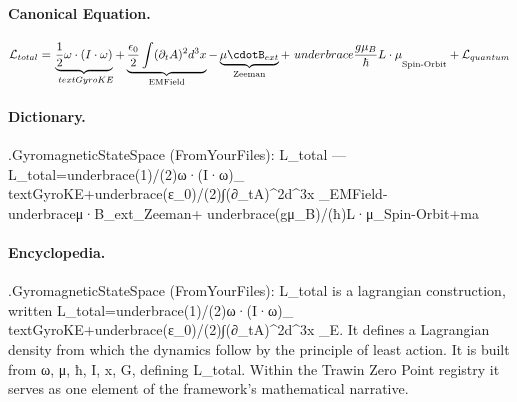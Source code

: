 \paragraph{Canonical Equation.}
\[
\mathcal{L}_{total}=\underbrace{\frac{1}{2}\omega\cdot(I\cdot\omega)}_{\ text{GyroKE}}+\underbrace{\frac{\epsilon_0}{2}\int(\partial_tA)^2d^3x }_{\text{EMField}}-\underbrace{\mu\cdotB_{ext}}_{\text{Zeeman}}+\ underbrace{\frac{g\mu_B}{\hbar}L\cdot\mu}_{\text{Spin-Orbit}}+\mathcal{ L}_{quantum}
\]

\paragraph{Dictionary.}
.GyromagneticStateSpace (FromYourFiles): L\_total — L\_total=underbrace(1)/(2)ω·(I·ω)\_ textGyroKE+underbrace(ε\_0)/(2)∫(∂\_tA)\textasciicircum{}2d\textasciicircum{}3x \_EMField-underbraceμ·B\_ext\_Zeeman+ underbrace(gμ\_B)/(ħ)L·μ\_Spin-Orbit+ma

\paragraph{Encyclopedia.}
.GyromagneticStateSpace (FromYourFiles): L\_total is a lagrangian construction, written L\_total=underbrace(1)/(2)ω·(I·ω)\_ textGyroKE+underbrace(ε\_0)/(2)∫(∂\_tA)\textasciicircum{}2d\textasciicircum{}3x \_E. It defines a Lagrangian density from which the dynamics follow by the principle of least action. It is built from ω, μ, ħ, I, x, G, defining L\_total. Within the Trawin Zero Point registry it serves as one element of the framework's mathematical narrative.
